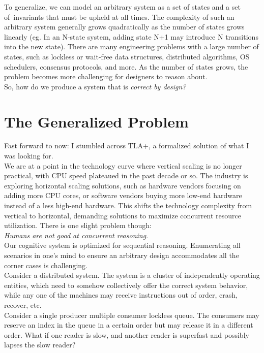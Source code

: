To generalize, we can model an arbitrary system as a set of states and a set
of invariants that must be upheld at all times. The complexity of such an
arbitrary system generally grows quadratically as the number of states grows
linearly (eg.  In an N-state system, adding state N+1 may introduce N
transitions into the new state). There are many engineering problems with a
large number of states, such as lockless or wait-free data structures,
distributed algorithms, OS schedulers, consensus protocols, and more. As the
number of states grows, the problem becomes more challenging for designers to
reason about.\\

So, how do we produce a system that is \textit{correct by design?} 

\section{The Generalized Problem}

Fast forward to now: I stumbled across TLA+, a formalized solution of what I
was looking for.\\

We are at a point in the technology curve where vertical scaling is no
longer practical, with CPU speed plateaued in the past decade or so. The industry
is exploring horizontal scaling solutions, such as hardware vendors focusing on
adding more CPU cores, or software vendors buying more low-end hardware instead
of a less high-end hardware. This shifts the technology complexity from vertical
to horizontal, demanding solutions to maximize concurrent resource
utilization. There is one slight problem though:\\

\textit{Humans are not good at concurrent reasoning}.\\

Our cognitive system is optimized for sequential reasoning. Enumerating
all scenarios in one's mind to ensure an arbitrary design accommodates all
the corner cases is challenging.\\

Consider a distributed system. The system is a cluster of independently operating
entities, which need to somehow collectively offer the correct system behavior,
while any one of the machines may receive instructions out of order, crash,
recover, etc.\\

Consider a single producer multiple consumer lockless queue. The consumers may
reserve an index in the queue in a certain order but may release it in a
different order. What if one reader is slow, and another reader is superfast
and possibly lapses the slow reader?\\

